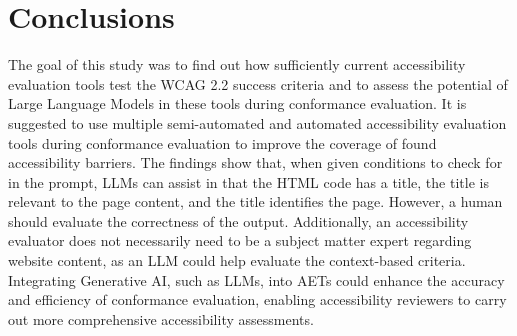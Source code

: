 \chapter{Conclusions\label{conclusions}}

The goal of this study was to find out how sufficiently current accessibility evaluation tools test the WCAG 2.2 success criteria and to assess the potential of Large Language Models in these tools during conformance evaluation. It is suggested to use multiple semi-automated and automated accessibility evaluation tools during conformance evaluation to improve the coverage of found accessibility barriers. The findings show that, when given conditions to check for in the prompt, LLMs can assist in that the HTML code has a title, the title is relevant to the page content, and the title identifies the page. However, a human should evaluate the correctness of the output. Additionally, an accessibility evaluator does not necessarily need to be a subject matter expert regarding website content, as an LLM could help evaluate the context-based criteria. Integrating Generative AI, such as LLMs, into AETs could enhance the accuracy and efficiency of conformance evaluation, enabling accessibility reviewers to carry out more comprehensive accessibility assessments.


